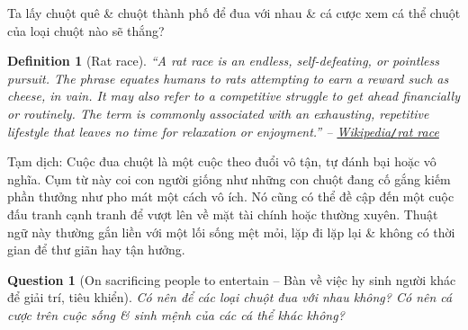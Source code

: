 \documentclass[12pt]{article}
\newtheorem{definition}{Definition}[section]
\newtheorem{question}{Question}
\begin{document}
Ta lấy chuột quê \& chuột thành phố để đua với nhau \& cá cược xem cá thể chuột của loại chuột nào sẽ thắng?

\begin{definition}[Rat race]
	``A \emph{rat race} is an endless, self-defeating, or pointless pursuit. The phrase equates humans to rats attempting to earn a reward such as cheese, in vain. It may also refer to a competitive struggle to get ahead financially or routinely. The term is commonly associated with an exhausting, repetitive lifestyle that leaves no time for relaxation or enjoyment.'' -- \href{https://en.wikipedia.org/wiki/Rat_race}{Wikipedia{\tt/}rat race}
\end{definition}
{\sf Tạm dịch}: Cuộc đua chuột là một cuộc theo đuổi vô tận, tự đánh bại hoặc vô nghĩa. Cụm từ này coi con người giống như những con chuột đang cố gắng kiếm phần thưởng như pho mát một cách vô ích. Nó cũng có thể đề cập đến một cuộc đấu tranh cạnh tranh để vượt lên về mặt tài chính hoặc thường xuyên. Thuật ngữ này thường gắn liền với một lối sống mệt mỏi, lặp đi lặp lại \& không có thời gian để thư giãn hay tận hưởng.

\begin{question}[On sacrificing people to entertain -- Bàn về việc hy sinh người khác để giải trí, tiêu khiển]
	Có nên để các loại chuột đua với nhau không? Có nên cá cược trên cuộc sống \& sinh mệnh của các cá thể khác không?
\end{question}
\end{document}
